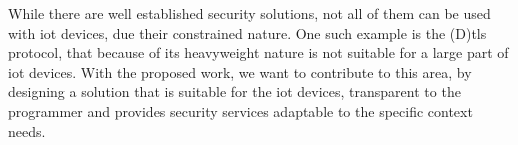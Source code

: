 \documentclass{llncs}
\begin{document}
While there are well established security solutions, not all of them can be used
with \gls{iot} devices, due their constrained nature. One such example is
the (D)\gls{tls} protocol, that because of its heavyweight nature is not suitable for a large part of \gls{iot} devices. With the proposed work,
we want to contribute to this area, by designing a solution that is suitable for the \gls{iot} devices, transparent
to the programmer and provides security services adaptable to the specific context needs.

%
\nocite{*}


%
\printglossary[style=long]
%
\end{document}
